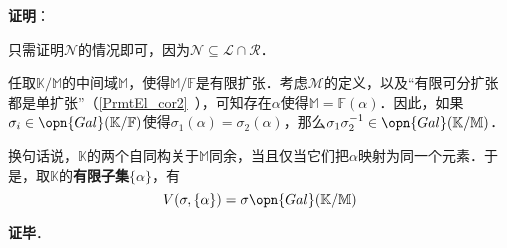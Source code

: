 \textbf{证明}：

只需证明$\mathcal{N}$的情况即可，因为$\mathcal{N}\subseteq \mathcal{L}\cap\mathcal{R}$．

任取$\mathbb{K}/\mathbb{M}$的中间域$\mathbb{M}$，使得$\mathbb{M}/\mathbb{F}$是有限扩张．考虑$\mathcal{M}$的定义，以及“有限可分扩张都是单扩张”（\autoref{PrmtEl_cor2}~），可知存在$\alpha$使得$\mathbb{M}=\mathbb{F}(\alpha)$．因此，如果$\sigma_i\in\opn{Gal}(\mathbb{K}/\mathbb{F})$使得$\sigma_1(\alpha)=\sigma_2(\alpha)$，那么$\sigma_1\sigma_2^{-1}\in\opn{Gal}(\mathbb{K}/\mathbb{M})$．

换句话说，$\mathbb{K}$的两个自同构关于$\mathbb{M}$同余，当且仅当它们把$\alpha$映射为同一个元素．于是，取$\mathbb{K}$的\textbf{有限子集}$\{\alpha\}$，有
\begin{equation}
V(\sigma, \{\alpha\}) = \sigma \opn{Gal}(\mathbb{K}/\mathbb{M})
\end{equation}

\textbf{证毕}．



































